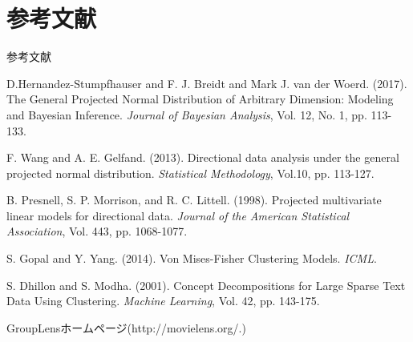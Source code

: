 \documentclass[dvipdfmx]{beamer} %
\begin{document}
\section{参考文献}
\begin{frame}{参考文献}

{\scriptsize
\begin{thebibliography}{99}
\beamertemplatetextbibitems %

D.Hernandez-Stumpfhauser and F. J. Breidt and Mark J. van der Woerd. (2017). The General Projected Normal Distribution of Arbitrary Dimension: Modeling and Bayesian Inference. {\it Journal of Bayesian Analysis}, Vol. 12, No. 1, pp. 113-133.

F. Wang and A. E. Gelfand. (2013). Directional data analysis under the general
projected normal distribution. {\it Statistical Methodology}, Vol.10, pp. 113-127.

B. Presnell, S. P. Morrison, and R. C. Littell. (1998). Projected multivariate linear models for
directional data. {\it Journal of the American Statistical Association}, Vol. 443, pp. 1068-1077.


S. Gopal and Y. Yang. (2014). Von Mises-Fisher Clustering Models. {\it ICML}.

S. Dhillon and S. Modha. (2001). Concept Decompositions for Large Sparse Text Data Using
Clustering. {\it Machine Learning}, Vol. 42, pp. 143-175.

GroupLensホームページ(http://movielens.org/.) 

\end{thebibliography}
}

\end{frame}
\end{document}
